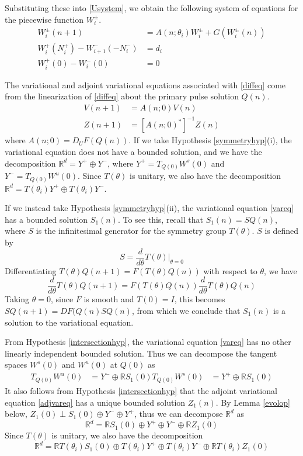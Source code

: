 \documentclass[12pt]{article}
\def\R{{\mathbb R}}
\begin{document}
Substituting these into \eqref{Usystem}, we obtain the following system of equations for the piecewise function $W_i^\pm$.
\begin{align}
W_i^\pm(n+1) &= A(n; \theta_i) W_i^\pm + G(W_i^\pm(n)) \label{Wsystem1} \\
W_i^+(N_i^+) - W_{i+1}^-(-N_i^-) &= d_i \label{Wsystem2} \\
W_i^+(0) - W_i^-(0) &= 0 \label{Wsystem3}
\end{align}

The variational and adjoint variational equations associated with \eqref{diffeq} come from the linearization of \eqref{diffeq} about the primary pulse solution $Q(n)$.
\begin{align}
V(n+1) &= A(n; 0) V(n) \label{vareq} \\
Z(n+1) &= [A(n; 0)^*]^{-1} Z(n) \label{adjvareq} 
\end{align}
where $A(n; 0) = D_U F(Q(n))$. If we take Hypothesis \ref{symmetryhyp}(i), the variational equation does not have a bounded solution, and we have the decomposition $\R^d = Y^+ \oplus Y^-$, where $Y^+ = T_{Q(0)} W^s(0)$ and $Y^- = T_{Q(0)} W^u(0)$. Since $T(\theta)$ is unitary, we also have the decomposition $\R^d = T(\theta_i) Y^+ \oplus T(\theta_i) Y^-$.

If we instead take Hypothesis \ref{symmetryhyp}(ii), the variational equation \eqref{vareq} has a bounded solution $S_1(n)$. To see this, recall that $S_1(n) = S Q(n)$, where $S$ is the infinitesimal generator for the symmetry group $T(\theta)$. $S$ is defined by
\begin{equation}
S = \frac{d}{d \theta} T(\theta)\Big|_{\theta = 0}
\end{equation}
Differentiating $T(\theta) Q(n+1) = F(T(\theta)Q(n))$ with respect to $\theta$, we have
\[
\frac{d}{d \theta}T(\theta) Q(n+1) = F(T(\theta)Q(n)) \frac{d}{d \theta}T(\theta) Q(n)
\]
Taking $\theta = 0$, since $F$ is smooth and $T(0) = I$, this becomes $S Q(n+1) = DF(Q(n) S Q(n)$, from which we conclude that $S_1(n)$ is a solution to the variational equation. 

From Hypothesis \ref{intersectionhyp}, the variational equation \eqref{vareq} has no other linearly independent bounded solution. Thus we can decompose the tangent spaces $W^s(0)$ and $W^u(0)$ at $Q(0)$ as
\begin{align*}
T_{Q(0)} W^u(0) &= Y^- \oplus \R S_1(0)
T_{Q(0)} W^s(0) &= Y^+ \oplus \R S_1(0)
\end{align*}
It also follows from Hypothesis \ref{intersectionhyp} that the adjoint variational equation \eqref{adjvareq} has a unique bounded solution $Z_1(n)$. By Lemma \ref{evolop} below, $Z_1(0) \perp S_1(0) \oplus Y^- \oplus Y^+$, thus we can decompose $\R^d$ as
\begin{equation}\label{nontdecomp}
\R^d = \R S_1(0) \oplus Y^+ \oplus Y^- \oplus \R Z_1(0)
\end{equation}
Since $T(\theta)$ is unitary, we also have the decomposition
\begin{equation}\label{nontdecomp}
\R^d = \R T(\theta_i) S_1(0) \oplus T(\theta_i) Y^+ \oplus T(\theta_i) Y^- \oplus \R T(\theta_i) Z_1(0)
\end{equation}
\end{document}
